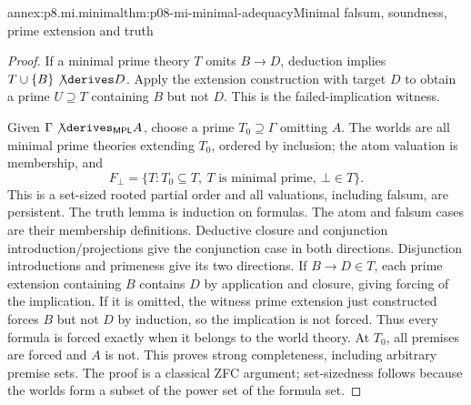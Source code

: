 \begin{annexitem}{annex:p8.mi.minimal}{thm:p08-mi-minimal-adequacy}{Minimal falsum, soundness, prime extension and truth}
\begin{proof}
If a minimal prime theory \(T\) omits \(B\to D\), deduction implies
\(T\cup\{B\}\not\derives D\). Apply the extension construction
with target \(D\) to obtain a prime \(U\supseteq T\) containing
\(B\) but not \(D\). This is the failed-implication witness.

Given \(\Gamma\not\derives_{\mathsf{MPL}}A\), choose a prime
\(T_0\supseteq\Gamma\) omitting \(A\). The worlds are all minimal
prime theories extending \(T_0\), ordered by inclusion; the atom
valuation is membership, and
\[
 F_{\bot}=\{T:T_0\subseteq T,\ T\text{ is minimal prime},\ \bot\in T\}.
\]
This is a set-sized rooted partial order and all valuations, including
falsum, are persistent. The truth lemma is induction on formulas.
The atom and falsum cases are their membership definitions. Deductive
closure and conjunction introduction/projections give the conjunction
case in both directions. Disjunction introductions and primeness give
its two directions. If \(B\to D\in T\), each prime extension
containing \(B\) contains \(D\) by application and closure, giving
forcing of the implication. If it is omitted, the witness prime
extension just constructed forces \(B\) but not \(D\) by induction,
so the implication is not forced. Thus every formula is forced exactly
when it belongs to the world theory. At \(T_0\), all premises are
forced and \(A\) is not. This proves strong completeness, including
arbitrary premise sets. The proof is a classical ZFC argument;
set-sizedness follows because the worlds form a subset of the power
set of the formula set.
\end{proof}
\end{annexitem}

